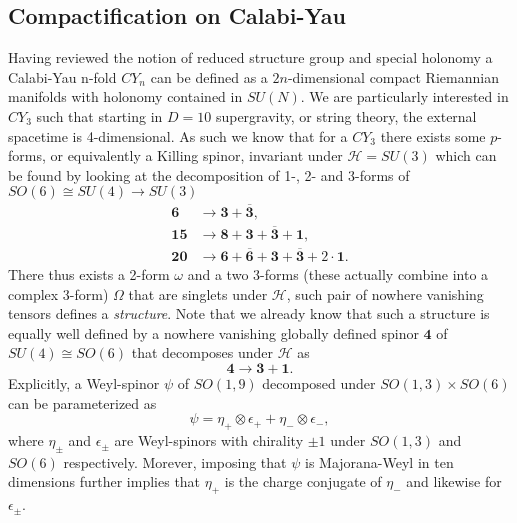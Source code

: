\subsection{Compactification on Calabi-Yau}\label{sec:CalabiYau}
Having reviewed the notion of reduced structure group and special holonomy a Calabi-Yau n-fold $CY_{n}$ can be defined as a $2n$-dimensional compact Riemannian manifolds with holonomy contained in $SU(N)$\cite{Blumenhagen2013}. We are particularly interested in $CY_3$ such that starting in $D=10$ supergravity, or string theory, the external spacetime is 4-dimensional. As such we know that for a $CY_3$ there exists some $p$-forms, or equivalently a Killing spinor, invariant under $\mathscr{H}=SU(3)$ which can be found by looking at the decomposition of 1-, 2- and 3-forms of $SO(6)\cong SU(4)\to SU(3)$
\begin{align*}
    \mathbf{6}&\to \mathbf{3}+\mathbf{\overbar{3}},\\
    \mathbf{15}&\to \mathbf{8}+\mathbf{3}+\overbar{\mathbf{3}}+\mathbf{1},\\
    \mathbf{20}&\to \mathbf{6}+\overbar{\mathbf{6}}+\mathbf{3}+\overbar{\mathbf{3}}+2\cdot\mathbf{1}.
\end{align*}
There thus exists a 2-form $\omega$ and a two 3-forms (these actually combine into a complex 3-form) $\Omega$ that are singlets under $\mathscr{H}$, such pair of nowhere vanishing tensors defines a \emph{structure}. Note that we already know that such a structure is equally well defined by a nowhere vanishing globally defined spinor $\mathbf{4}$ of $SU(4)\cong SO(6)$ that decomposes under $\mathscr{H}$ as 
\begin{equation}
    \mathbf{4}\to \mathbf{3}+\mathbf{1}.
\end{equation}
Explicitly, a Weyl-spinor $\psi$ of $SO(1,9)$ decomposed under $SO(1,3)\times SO(6)$ can be parameterized as 
\begin{equation}
    \psi = \eta_+\otimes\epsilon_++\eta_-\otimes\epsilon_-,
\end{equation}
where $\eta_\pm$ and $\epsilon_\pm$ are Weyl-spinors with chirality $\pm 1$ under $SO(1,3)$ and $SO(6)$ respectively. Morever, imposing that $\psi$ is Majorana-Weyl in ten dimensions further implies that $\eta_+$ is the charge conjugate of $\eta_-$ and likewise for $\epsilon_\pm$.

